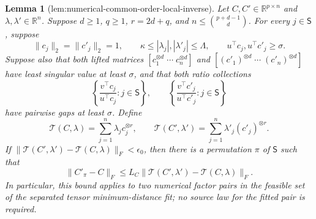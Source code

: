 \documentclass{article}
\newtheorem{lemma}{Lemma}
\begin{document}
\begin{lemma}[lem:numerical-common-order-local-inverse]\label{lem:numerical-common-order-local-inverse}
Let \(C,C'\in\mathbb R^{p\times n}\) and \(\lambda,\lambda'\in\mathbb R^n\). Suppose \(d\ge1\), \(q\ge1\), \(r=2d+q\), and \(n\le\binom{p+d-1}{d}\). For every \(j\in\mathsf S\), suppose
\[
 \lVert c_j\rVert_2=\lVert c'_j\rVert_2=1,
 \qquad
 \kappa\le |\lambda_j|,|\lambda'_j|\le\Lambda,
 \qquad
 u^\top c_j,u^\top c'_j\ge\sigma.
\]
Suppose also that both lifted matrices \([c_1^{\otimes d}\;\cdots\;c_n^{\otimes d}]\) and \([(c'_1)^{\otimes d}\;\cdots\;(c'_n)^{\otimes d}]\) have least singular value at least \(\sigma\), and that both ratio collections
\[
 \left\{\frac{v^\top c_j}{u^\top c_j}:j\in\mathsf S\right\},
 \qquad
 \left\{\frac{v^\top c'_j}{u^\top c'_j}:j\in\mathsf S\right\}
\]
have pairwise gaps at least \(\sigma\). Define
\[
 \mathcal T(C,\lambda)=\sum_{j=1}^n\lambda_jc_j^{\otimes r},
 \qquad
 \mathcal T(C',\lambda')=\sum_{j=1}^n\lambda'_j(c'_j)^{\otimes r}.
\]
If \(\lVert\mathcal T(C',\lambda')-\mathcal T(C,\lambda)\rVert_F<\epsilon_0\), then there is a permutation \(\pi\) of \(\mathsf S\) such that
\[
 \lVert C'_{\pi}-C\rVert_F
 \le L_C\lVert\mathcal T(C',\lambda')-\mathcal T(C,\lambda)\rVert_F.
\]
In particular, this bound applies to two numerical factor pairs in the feasible set of the separated tensor minimum-distance fit; no source law for the fitted pair is required.
\end{lemma}
\end{document}
